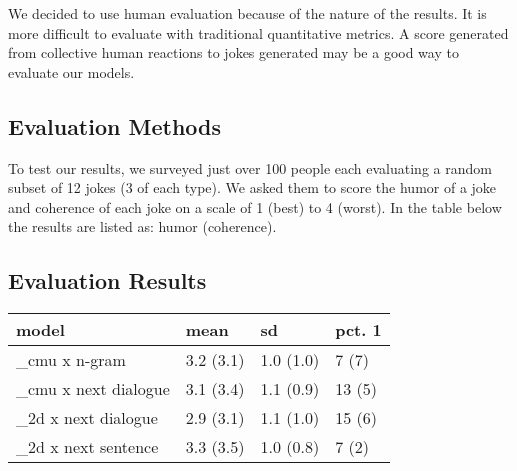 \documentclass[twoside,twocolumn]{article}
\begin{document}
We decided to use human evaluation because of the nature of the results. It is more difficult to evaluate with traditional quantitative metrics. A score generated from collective human reactions to jokes generated may be a good way to evaluate our models.

\subsection{Evaluation Methods}

To test our results, we surveyed just over 100 people each evaluating a random subset of 12 jokes (3 of each type). We asked them to score the humor of a joke and coherence of each joke on a scale of 1 (best) to 4 (worst). In the table below the results are listed as: humor (coherence).

\subsection{Evaluation Results}



\begin{center}
    \begin{tabular}{ p{2.0cm} | p{1.2cm}| p{1.2cm} | p{0.9cm} }
    model & mean & sd & pct. 1 \\
    \hline
    \_cmu x n-gram & 3.2 (3.1) & 1.0 (1.0) & 7 (7) \\ 
    \hline
    \_cmu x next dialogue & 3.1 (3.4) & 1.1 (0.9) & 13 (5) \\ 
    \hline
    \_2d x next dialogue & 2.9 (3.1) & 1.1 (1.0) & 15 (6) \\ 
    \hline
    \_2d x next sentence & 3.3 (3.5) & 1.0 (0.8) & 7 (2) \\ 
    \end{tabular}
\end{center}
    
    


\end{document}
